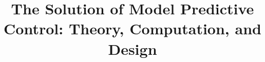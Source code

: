 \documentclass[]{article}
\title{The Solution of Model Predictive Control: Theory, Computation, and Design}
\author{}
\begin{document}
\maketitle

\begin{abstract}

\end{abstract}

\section{}
\end{document}
